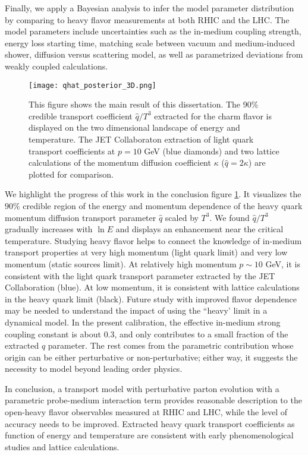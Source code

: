 Finally, we apply a Bayesian analysis to infer the model parameter distribution by comparing to heavy flavor measurements at both RHIC and the LHC.
The model parameters include uncertainties such as the in-medium coupling strength, energy loss starting time, matching scale between vacuum and medium-induced shower, diffusion versus scattering model, as well as parametrized deviations from weakly coupled calculations.

\begin{figure}
\centering
\texttt{[image: qhat\_posterior\_3D.png]}
\caption[This figure shows the main result of this dissertation. The 90\%]{This figure shows the main result of this dissertation. The 90\% credible transport coefficient $\hat{q}/T^3$ extracted for the charm flavor is displayed on the two dimensional landscape of energy and temperature. The JET Collaboraton extraction of light quark transport coefficients at $p=10$ GeV \cite{Burke:2013yra} (blue diamonds) and two lattice calculations of the momentum diffusion coefficient $\kappa$ ($\hat{q}=2\kappa$) \cite{Ding:2012sp,Banerjee:2011ra} are plotted for comparison.}
\label{fig:conlusion}
\end{figure}

We highlight the progress of this work in the conclusion figure \ref{fig:conlusion}.
It visualizes the $90\%$ credible region of the energy and momentum dependence of the heavy quark momentum diffusion transport parameter $\hat{q}$ scaled by $T^3$.
We found $\hat{q}/T^3$ gradually increases with $\ln E$ and displays an enhancement near the critical temperature.
Studying heavy flavor helps to connect the knowledge of in-medium transport properties at very high momentum (light quark limit) and very low momentum (static sources limit).
At relatively high momentum $p\sim 10$ GeV, it is consistent with the light quark transport parameter extracted by the JET Collaboration (blue).
At low momentum, it is consistent with lattice calculations in the heavy quark limit (black).
Future study with improved flavor dependence may be needed to understand the impact of using the ``heavy' limit in a dynamical model.
In the present calibration, the effective in-medium strong coupling constant is about $0.3$, and only contributes to a small fraction of the extracted $\hat{q}$ parameter.
The rest comes from the parametric contribution whose origin can be either perturbative or non-perturbative; either way, it suggests the necessity to model beyond leading order physics.

In conclusion, a transport model with perturbative parton evolution with a parametric probe-medium interaction term provides reasonable description to the open-heavy flavor observables measured at RHIC and LHC, while the level of accuracy needs to be improved.
Extracted heavy quark transport coefficients as function of energy and temperature are consistent with early phenomenological studies and lattice calculations.

